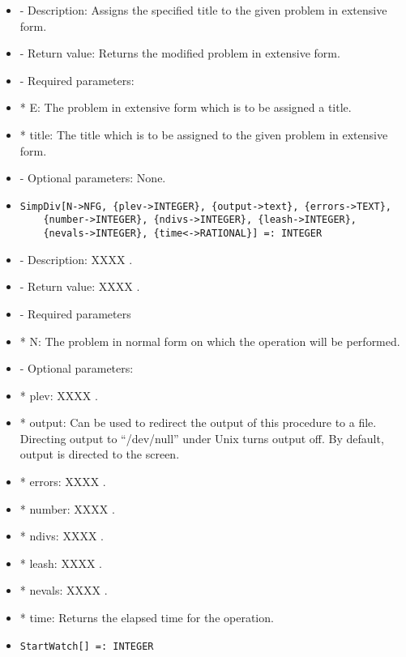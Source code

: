 \begin{itemize}
\bd
\item
- Description:  Assigns the specified title to the given problem in 
extensive form.
\item
- Return value:  Returns the modified problem in extensive form.
\item
- Required parameters:
	
\bd
\item
*  E:  The problem in extensive form which is to be assigned a title.
\item
*  title:  The title which is to be assigned to the given problem in 
extensive form.
\ed

\item
- Optional parameters:  None.
\ed

\item
\begin{verbatim}
SimpDiv[N->NFG, {plev->INTEGER}, {output->text}, {errors->TEXT},
	{number->INTEGER}, {ndivs->INTEGER}, {leash->INTEGER}, 
	{nevals->INTEGER}, {time<->RATIONAL}] =: INTEGER
\end{verbatim}

\bd
\item
- Description:  XXXX .
\item
- Return value:  XXXX .
\item
- Required parameters

\bd
\item
*  N:  The problem in normal form on which the operation will be performed.
\ed

\item
- Optional parameters:
	
\bd
\item
*  plev: XXXX .
\item
*  output:  Can be used to redirect the output of this procedure to a
file.  Directing output to ``/dev/null'' under Unix turns 
output off.  By default, output is directed to the screen.
\item
*  errors:  XXXX .
\item
*  number:  XXXX .
\item 
*  ndivs:  XXXX .
\item
*  leash:  XXXX .
\item
*  nevals:  XXXX .
\item
*  time:  Returns the elapsed time for the operation.
\ed
\ed

\item

\begin{verbatim}
StartWatch[] =: INTEGER
\end{verbatim}


\end{itemize}
